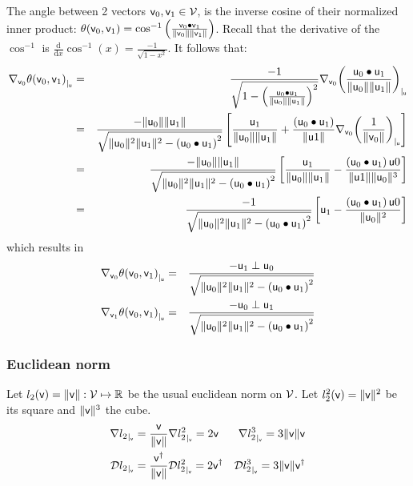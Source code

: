 The angle between 2 vectors $\mathsf{v}_0, \mathsf{v}_1 \in \mathcal{V}$,
is the inverse cosine of their normalized inner product:
$\theta(\mathsf{v}_0,\mathsf{v}_1)
=
\cos^{-1} \left( \frac{ \mathsf{v}_0 \bullet \mathsf{v}_1 } {\|\mathsf{v}_0\| \|\mathsf{v}_1\|} \right)$.
Recall that the derivative of the $\cos^{-1}$ is
$\frac{\mathrm d}{\mathrm dx} \cos^{-1}(x) = \frac{-1}{\sqrt{1 - x^2} }$.
It follows that:
\begin{eqnarray*}
{\mathbf \nabla}_{\mathsf{v}_0}{{\theta(\mathsf{v}_0,\mathsf{v}_1)}}_{\mid_{\mathsf{u}}}
& = &
\frac{-1}
{ \sqrt{1 - \left( \frac{\mathsf{u}_0 \bullet \mathsf{u}_1}{\| \mathsf{u}_0 \| \| \mathsf{u}_1 \|} \right)^2 }}
{\mathbf \nabla}_{\mathsf{v}_0}{{\left( \frac{\mathsf{u}_0 \bullet \mathsf{u}_1}{\| \mathsf{u}_0 \| \| \mathsf{u}_1 \|} \right)}}_{\mid_{\mathsf{u}}}
\\
& = &
\frac{-\|\mathsf{u}_0\|\|\mathsf{u}_1\|}
{ \sqrt{\|\mathsf{u}_0\|^2\|\mathsf{u}_1\|^2 - \left( \mathsf{u}_0 \bullet \mathsf{u}_1 \right)^2 }}
\left[
\frac{\mathsf{u}_1}{\|\mathsf{u}_0\|\|\mathsf{u}_1\|}
+
\frac{\left( \mathsf{u}_0 \bullet \mathsf{u}_1 \right)}{\| \mathsf{u}1 \|}
{\mathbf \nabla}_{\mathsf{v}_0}{{\left( \frac{1}{\| \mathsf{v}_0 \|} \right)}}_{\mid_{\mathsf{u}}}
\right]
\nonumber
\\
& = &
\frac{-\|\mathsf{u}_0\|\|\mathsf{u}_1\|}
{ \sqrt{\|\mathsf{u}_0\|^2\|\mathsf{u}_1\|^2 - \left( \mathsf{u}_0 \bullet \mathsf{u}_1 \right)^2 }}
\left[
\frac{\mathsf{u}_1}{\|\mathsf{u}_0\|\|\mathsf{u}_1\|}
-
\frac{\left( \mathsf{u}_0 \bullet \mathsf{u}_1 \right) \mathsf{u}0}{\| \mathsf{u}1 \| \|\mathsf{u}_0\|^3}
\right]
\nonumber
\\
& = &
\frac{-1}
{ \sqrt{\|\mathsf{u}_0\|^2\|\mathsf{u}_1\|^2 - \left( \mathsf{u}_0 \bullet \mathsf{u}_1 \right)^2 }}
\left[
\mathsf{u}_1
-
\frac{\left( \mathsf{u}_0 \bullet \mathsf{u}_1 \right) \mathsf{u}0}{\|\mathsf{u}_0\|^2}
\right]
\nonumber
\end{eqnarray*}
which results in
\begin{eqnarray}
\label{eq:angle_gradient}
{\mathbf \nabla}_{\mathsf{v}_0}{{\theta(\mathsf{v}_0,\mathsf{v}_1)}}_{\mid_{\mathsf{u}}}
& = &
\frac{- \mathsf{u}_1 \perp \mathsf{u}_0}
{ \sqrt{\|\mathsf{u}_0\|^2\|\mathsf{u}_1\|^2 - \left( \mathsf{u}_0 \bullet \mathsf{u}_1 \right)^2 }}
\\
{\mathbf \nabla}_{\mathsf{v}_1}{{\theta(\mathsf{v}_0,\mathsf{v}_1)}}_{\mid_{\mathsf{u}}}
& = &
\frac{- \mathsf{u}_0 \perp \mathsf{u}_1}
{ \sqrt{\|\mathsf{u}_0\|^2\|\mathsf{u}_1\|^2 - \left( \mathsf{u}_0 \bullet \mathsf{u}_1 \right)^2 }}
\nonumber
\end{eqnarray}


\subsubsection{Euclidean norm}
\label{sec:derivatives-of-euclidean-norm}

Let $l_2(\mathsf{v}) = \| \mathsf{v}  \|: \mathcal{V} \mapsto \mathbb{R}$
be the usual euclidean norm on $\mathcal{V}$.
Let $l_2^2(\mathsf{v}) = \| \mathsf{v}  \|^2 $
be its square and $ \| \mathsf{v}  \|^3$ the cube.
\begin{eqnarray}
\label{eq:l2-gradient}
{\mathbf \nabla}{l_2}_{\mid_{\mathsf{v}}} = \frac{ \mathsf{v} }{ \| \mathsf{v}  \|} &
{\mathbf \nabla}{l_2^2}_{\mid_{\mathsf{v}}} =  2\mathsf{v} &
{\mathbf \nabla}{l_2^3}_{\mid_{\mathsf{v}}} = 3 \| \mathsf{v}  \| \mathsf{v} \\
{\mathcal{D}{l_2}_{\mid_{\mathsf{v}}}} = \frac{ \mathsf{v}^\dagger }{ \| \mathsf{v}  \|} &
{\mathcal{D}{l_2^2}_{\mid_{\mathsf{v}}}} = 2\mathsf{v}{^\dagger} &
{\mathcal{D}{l_2^3}_{\mid_{\mathsf{v}}}} = 3 \| \mathsf{v}  \| \mathsf{v}^\dagger \nonumber
\end{eqnarray}

